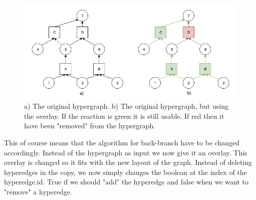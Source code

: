 \documentclass[a4paper,10pt,titlepage]{paper}
\begin{document}
\begin{figure}[H]
\centering
\includegraphics[scale=0.5]{Billeder/OverlayIllustration}
\caption{a) The original hypergraph. b) The original hypergraph, but using the overlay. If the reaction is green it is still usable. If red then it have been "removed" from the hypergraph.}
\end{figure}

This of course means that the algorithm for back-branch have to be changed accordingly. Instead of the hypergraph as input we now give it an overlay. This overlay is changed so it fits with the new layout of the graph. Instead of deleting hyperedges in the copy, we now simply changes the boolean at the index of the hyperedge.id. True if we should "add" the hyperedge and false when we want to "remove" a hyperedge.
\end{document}
